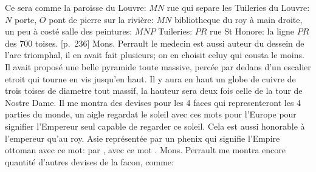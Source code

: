 Ce sera comme la paroisse du Louvre:\protect{} $MN$ rue qui separe les Tuileries\protect{} du Louvre:\protect{} 
$N$ porte, $O$ pont de pierre sur la rivi\`{e}re:\protect{}
$MN$ bibliotheque\protect{} du roy\protect{} \`{a} main droite, un peu à cost\'{e} salle des peintures:\protect{}
$MNP$ Tuileries:\protect{}
$PR$ rue St Honore: la ligne $PR$ des 700 toises. [p.~236]%
\pend%
\pstart%
Mons. Perrault\protect{} le medecin est aussi auteur du dessein de l'arc triomphal, il en avait fait plusieurs; on en choisit celuy qui cousta le moins. Il avait propos\'{e} une belle pyramide toute massive, perc\'{e}e par dedans d'un escalier etroit qui tourne en vis jusqu'en haut. Il y aura en haut un globe de cuivre de trois toises de diametre tout massif, la hauteur sera deux fois celle de la tour de Nostre Dame. Il me montra des devises pour les 4 faces qui representeront les 4 parties du monde, un aigle regardat le soleil avec ces mots  pour l'Europe\protect{} pour signifier l'Empereur seul capable de regarder ce soleil. Cela est aussi honorable à l'empereur qu'au roy\protect{}. Asie\protect{} repr\'{e}sent\'{e}e par un phenix qui signifie l'Empire ottoman\protect{} avec ce mot:
\protect{} par 
\pend
\newpage
\pstart\noindent {}, avec ce mot . Mons. Perrault\protect{} me montra encore quantit\'{e} d'autres devises de la facon, comme:
